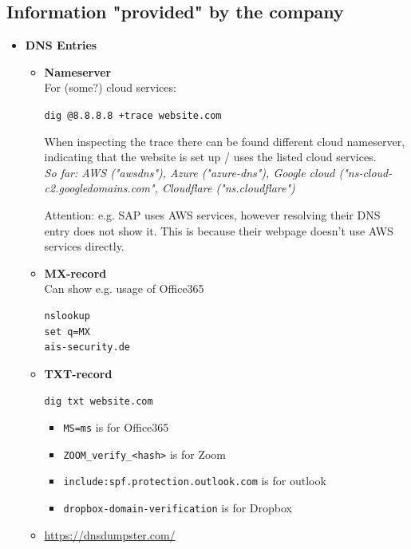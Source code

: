 \documentclass[12pt]{article}
\begin{document}
\subsection*{Information "provided" by the company}
\begin{itemize}
    \item \textbf{DNS Entries}
    \begin{itemize}
        \item \textbf{Nameserver}\\
        For (some?) cloud services:
    
        \verb|dig @8.8.8.8 +trace website.com|
        
        When inspecting the trace there can be found different cloud nameserver, indicating that the website is set up / uses the listed cloud services. \\
        \textit{So far: AWS ("awsdns"), Azure ("azure-dns"), Google cloud ("ns-cloud-c2.googledomains.com", Cloudflare ("ns.cloudflare")}
        
        Attention: e.g. SAP uses AWS services, however resolving their DNS entry does not show it. This is because their webpage doesn't use AWS services directly.
        
        \item \textbf{MX-record} \\
        Can show e.g. usage of Office365
        \begin{verbatim}
nslookup
set q=MX
ais-security.de
        \end{verbatim}
        
        \item \textbf{TXT-record}
        
        \verb|dig txt website.com|
        \begin{itemize}
            \item \verb|MS=ms| is for Office365
            \item \verb|ZOOM_verify_<hash>| is for Zoom
            \item \verb|include:spf.protection.outlook.com| is for outlook
            \item \verb|dropbox-domain-verification| is for Dropbox
        \end{itemize}
        
        
        \item \url{https://dnsdumpster.com/}
        
    \end{itemize}
    

\end{itemize}
\end{document}
